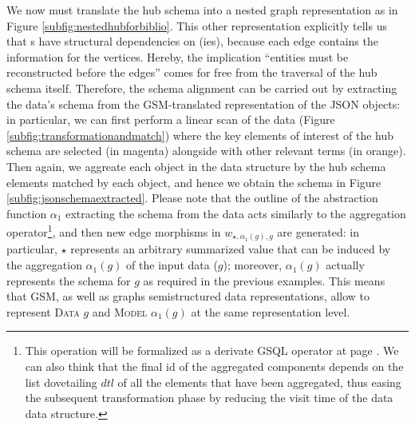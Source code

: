 \begin{example}[continues=ex:examplegraphdata,label=ex:examplereferencedOcaml]
We now must translate the hub schema into a nested graph representation as in Figure \vref{subfig:nestedhubforbiblio}. This other representation explicitly tells us that \RELA s have structural dependencies on \ONTA(ies), because each edge contains the information for the vertices. Hereby, the implication ``entities must be reconstructed before the edges'' comes for free from the traversal of the hub schema itself. Therefore, the schema alignment can be carried out by extracting the data's schema from the GSM-translated representation of the JSON objects: in particular, we can first perform a linear scan of the data (Figure \vref{subfig:transformationandmatch}) where the key elements of interest of the hub schema are selected (in magenta) alongside with other relevant terms (in orange). Then again, we aggreate each object in the data structure by the hub schema elements matched by each object, and hence we obtain the schema in Figure \ref{subfig:jsonschemaextracted}. Please note that the outline of the abstraction function $\alpha_1$	 extracting the schema from the data acts similarly to the aggregation operator\footnote{This operation will be formalized as a derivate GSQL operator at page \pageref{abstractionAlpha1}. We can also think that the final id of the aggregated components depends on the list dovetailing $dtl$ of all the elements that have been aggregated, thus easing the subsequent transformation phase by reducing the visit time of the data data structure. }, and then new edge morphisms in $w_{\star,\alpha_1(g),g}$ are generated: in particular, $\star$ represents an arbitrary summarized value that can be induced by the aggregation $\alpha_1(g)$ of the input data ($g$); moreover, $\alpha_1(g)$ actually represents the schema for $g$ as required in the previous examples.  This means that GSM, as well as graphs semistructured data representations, allow to represent \textsc{Data} $g$ and \textsc{Model} $\alpha_1(g)$ at the same representation level.


\end{example}
